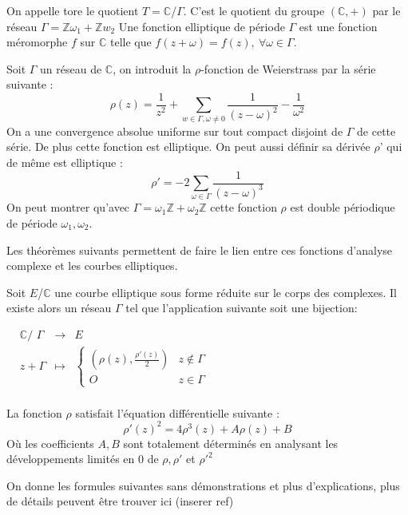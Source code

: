 \documentclass{article}
\begin{document}
\begin{defi}
On appelle tore le quotient $T = \mathbb{C}$/$\Gamma$. C'est le quotient du groupe $(\mathbb{C}, +)$ par le réseau $\Gamma = \mathbb{Z}\omega_1 + \mathbb{Z}w_2$
\newline
Une fonction elliptique de période $\Gamma$ est une fonction méromorphe $f$ sur $\mathbb{C}$ telle que $f(z + \omega) = f(z) ,\ \forall \omega \in \Gamma$.
\end{defi}

\begin{defi}
Soit $\Gamma$ un réseau de $\mathbb{C}$, on introduit la $\rho$-fonction de Weierstrass par la série suivante :
\begin{equation*}
\rho(z) = \frac{1}{z^2} + \sum_{w \in \Gamma, \omega \ne 0} \frac{1}{(z-\omega)^2} - \frac{1}{\omega^2}
\end{equation*}
On a une convergence absolue uniforme sur tout compact disjoint de $\Gamma$ de cette série. De plus cette fonction est elliptique. On peut aussi définir sa dérivée $\rho$' qui de même est elliptique :
\begin{equation*}
\rho' = -2 \sum_{\omega \in \Gamma} \frac{1}{(z-\omega)^3}
\end{equation*}
On peut montrer qu'avec $\Gamma = \omega_1 \mathbb{Z} + \omega_2 \mathbb{Z}$ cette fonction $\rho$ est double périodique de période $\omega_1, \omega_2$.
\end{defi}

Les théorèmes suivants permettent de faire le lien entre ces fonctions d'analyse complexe et les courbes elliptiques.

\begin{thm}
Soit $E$/$\mathbb{C}$ une courbe elliptique sous forme réduite sur le corps des complexes. Il existe alors un réseau $\Gamma$ tel que l'application suivante soit une bijection:
\newline
\medskip


$\begin{array}{cccc}
& \mathbb{C}\text{/ }\Gamma & \to & E \\
& z + \Gamma & \mapsto & \left\lbrace
\begin{array}{cc}
 (\rho(z), \frac{\rho'(z)}{2})  & z \notin \Gamma \\
 O & z \in \Gamma
\end{array}\right.\\
\end{array}$
\end{thm}

\begin{thm}
La fonction $\rho$ satisfait l'équation différentielle suivante : 
\begin{equation*}
\rho'(z)^2 = 4\rho^3(z) + A \rho(z) + B
\end{equation*}
Où les coefficients $A,B$ sont totalement déterminés en analysant les développements limités en $0$ de $\rho, \rho'$ et $\rho'^2$ 
\end{thm}
On donne les formules suivantes sans démonstrations et plus d'explications, plus de détails peuvent être trouver ici (inserer ref)
\end{document}
